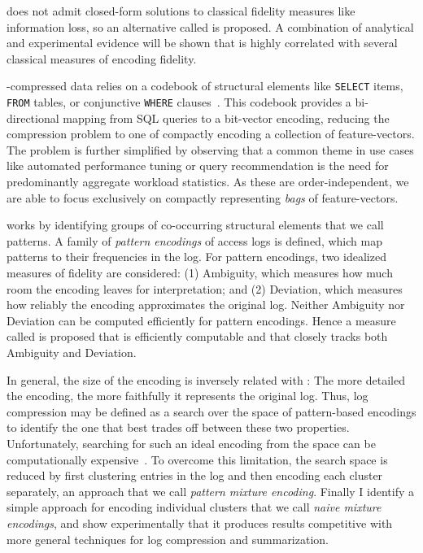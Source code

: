 \systemnameone does not admit closed-form solutions to classical fidelity measures like information loss, so an alternative called \emph{\errorname} is proposed.
A combination of analytical and experimental evidence will be shown that \errorname is highly correlated with several classical measures of encoding fidelity.

\systemnameone-compressed data relies on a codebook of structural elements like \texttt{SELECT} items, \texttt{FROM} tables, or conjunctive \texttt{WHERE} clauses~\cite{DBLP:journals/kais/AligonGMRT14}.
This codebook provides a bi-directional mapping from SQL queries to a bit-vector encoding, reducing the compression problem to one of compactly encoding a collection of feature-vectors.
The problem is further simplified by observing that a common theme in use cases like automated performance tuning or query recommendation is the need for predominantly aggregate workload statistics.
As these are order-independent, we are able to focus exclusively on compactly representing \emph{bags} of feature-vectors.

\systemnameone works by identifying groups of co-occurring structural elements that we call patterns.  
A family of \emph{pattern encodings} of access logs is defined, which map patterns to their frequencies in the log.
For pattern encodings, two idealized measures of fidelity are considered: 
(1) Ambiguity, which measures how much room the encoding leaves for interpretation; and 
(2) Deviation, which measures how reliably the encoding approximates the original log.
Neither Ambiguity nor Deviation can be computed efficiently for pattern encodings.
Hence a measure called \emph{\errorname} is proposed that is efficiently computable and that closely tracks both Ambiguity and Deviation.

In general, the size of the encoding is inversely related with \errorname: The more detailed the encoding, the more faithfully it represents the original log.
Thus, log compression may be defined as a search over the space of pattern-based encodings to identify the one that best trades off between these two properties.
Unfortunately, searching for such an ideal encoding from the space can be computationally expensive~\cite{DBLP:journals/tkdd/MampaeyVT12,DBLP:journals/pvldb/GebalyAGKS14}.
To overcome this limitation, the search space is reduced by first clustering entries in the log and then encoding each cluster separately, an approach that we call \textit{pattern mixture encoding}.
Finally I identify a simple approach for encoding individual clusters that we call \textit{naive mixture encodings}, and show experimentally that it produces results competitive with more general techniques for log compression and summarization.

